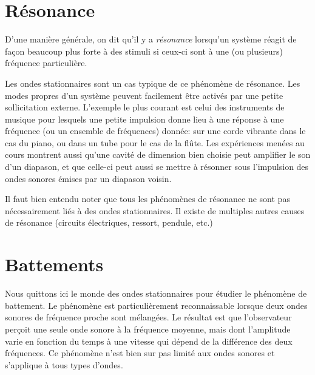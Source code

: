 \section{Résonance}

D'une manière générale, on dit qu'il y a {\it résonance} lorsqu'un système réagit de façon beaucoup plus forte à des stimuli si ceux-ci sont à une (ou plusieurs) fréquence particulière. 

\noindent Les ondes stationnaires sont un cas typique de ce phénomène de résonance. Les modes propres d'un système peuvent facilement être activés par une petite sollicitation externe. L'exemple le plus courant est celui des instruments de musique pour lesquels une petite impulsion donne lieu à une réponse à une fréquence (ou un ensemble de fréquences) donnée: sur une corde vibrante dans le cas du piano, ou dans un tube pour le cas de la flûte. Les expériences menées au cours montrent aussi qu'une cavité de dimension bien choisie peut amplifier le son d'un diapason, et que celle-ci peut aussi se mettre à résonner sous l'impulsion des ondes sonores émises par un diapason voisin.


\noindent Il faut bien entendu noter que tous les phénomènes de résonance ne sont pas nécessairement liés à des ondes stationnaires. Il existe de multiples autres causes de résonance (circuits électriques, ressort, pendule, etc.)



\section{Battements}
Nous quittons ici le monde des ondes stationnaires pour étudier le phénomène de battement.
Le phénomène est particulièrement reconnaissable lorsque deux ondes sonores de fréquence proche sont mélangées. Le résultat est que l'observateur perçoit une seule onde sonore à la fréquence moyenne, mais dont l'amplitude varie en fonction du temps à une vitesse qui dépend de la différence des deux fréquences. Ce phénomène n'est bien sur pas limité aux ondes sonores et s'applique à tous types d'ondes.

